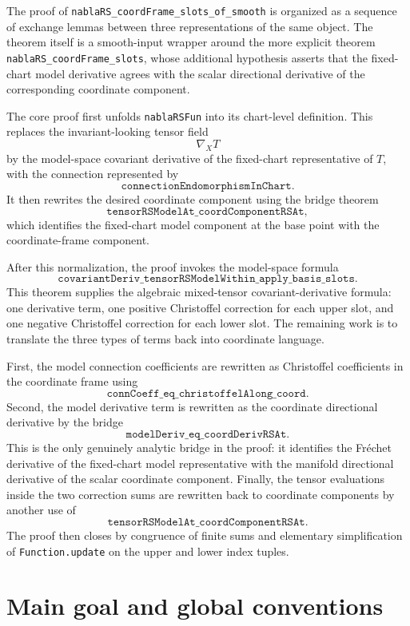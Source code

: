\documentclass[11pt]{article}
\theoremstyle{plain}
\theoremstyle{definition}
\theoremstyle{remark}
\begin{document}
The proof of \texttt{nablaRS\_coordFrame\_slots\_of\_smooth} is organized as a
sequence of exchange lemmas between three representations of the same object.
The theorem itself is a smooth-input wrapper around the more explicit theorem
\texttt{nablaRS\_coordFrame\_slots}, whose additional hypothesis asserts that
the fixed-chart model derivative agrees with the scalar directional derivative
of the corresponding coordinate component.

The core proof first unfolds \texttt{nablaRSFun} into its chart-level
definition.  This replaces the invariant-looking tensor field
\[
  \nabla_XT
\]
by the model-space covariant derivative of the fixed-chart representative of
$T$, with the connection represented by
\[
  \texttt{connectionEndomorphismInChart}.
\]
It then rewrites the desired coordinate component using the bridge theorem
\[
  \texttt{tensorRSModelAt\_coordComponentRSAt},
\]
which identifies the fixed-chart model component at the base point with the
coordinate-frame component.

After this normalization, the proof invokes the model-space formula
\[
  \texttt{covariantDeriv\_tensorRSModelWithin\_apply\_basis\_slots}.
\]
This theorem supplies the algebraic mixed-tensor covariant-derivative formula:
one derivative term, one positive Christoffel correction for each upper slot,
and one negative Christoffel correction for each lower slot.  The remaining work
is to translate the three types of terms back into coordinate language.

First, the model connection coefficients are rewritten as Christoffel
coefficients in the coordinate frame using
\[
  \texttt{connCoeff\_eq\_christoffelAlong\_coord}.
\]
Second, the model derivative term is rewritten as the coordinate directional
derivative by the bridge
\[
  \texttt{modelDeriv\_eq\_coordDerivRSAt}.
\]
This is the only genuinely analytic bridge in the proof: it identifies the
Fr\'echet derivative of the fixed-chart model representative with the manifold
directional derivative of the scalar coordinate component.  Finally, the tensor
evaluations inside the two correction sums are rewritten back to coordinate
components by another use of
\[
  \texttt{tensorRSModelAt\_coordComponentRSAt}.
\]
The proof then closes by congruence of finite sums and elementary simplification
of \texttt{Function.update} on the upper and lower index tuples.

\section{Main goal and global conventions}
\end{document}
